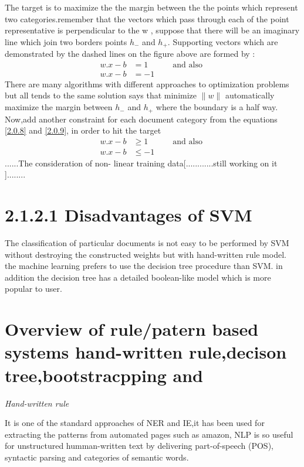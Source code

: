The target is to maximize the the margin between the the points which represent two categories.remember that the vectors which pass through each of the point representative is perpendicular to the w , suppose that there will be an imaginary line which join two borders points $ h_{-}$ and $ h_{+}$.
Supporting vectors which are demonstrated by the dashed lines on the figure above  are formed by :
\begin{align}
w.x- b & = 1 \label{2.0.8} \quad \quad \quad  \text{and also } \\
w.x- b & = -1 \label{2.0.9}
\end{align}
There are many algorithms with different approaches to optimization problems but all tends to the same solution says that minimize $\parallel w \parallel$ automatically maximize the margin between $ h_{-}$ and $ h_{+}$ where the boundary is a half way. 
Now,add another constraint for each document category from the equations \eqref{2.0.8} and \eqref{2.0.9}, in order to hit the target 
\begin{align}
w.x- b & \geq     1 \label{2.0.8} \quad \quad \quad  \text{and also } \\
w.x- b & \leq -1 \label{2.0.9}
\end{align}
......The consideration of non- linear training data[............still working on it ]........ 

\section*{2.1.2.1 Disadvantages of SVM} 

The classification of particular documents is not easy to be performed by SVM without destroying the constructed weights  but with hand-written rule model. the machine learning prefers to use the decision tree procedure than SVM. in addition the decision tree has a detailed boolean-like  model which is more popular to user.

\section*{Overview of rule/patern based systems hand-written rule,decison tree,bootstracpping and  }

\textit{Hand-written rule}

It is one of the standard approaches of NER and IE,it has been used for extracting the patterns from automated pages such as amazon, NLP is so useful for unstructured humman-written text by delivering  part-of-speech (POS), syntactic parsing and categories of semantic words.

